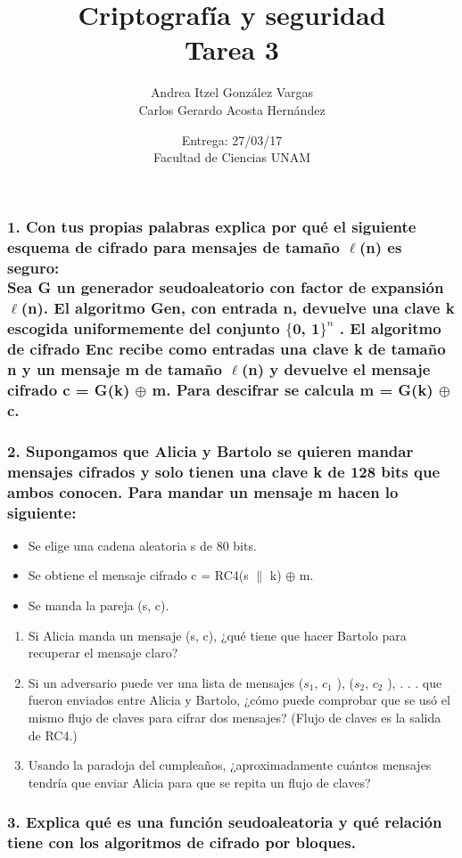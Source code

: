 \documentclass[12pt]{article}
\title{Criptografía y seguridad \\ Tarea 3}
\author{Andrea Itzel González Vargas \\ Carlos Gerardo Acosta Hernández}
\date{Entrega: 27/03/17 \\ Facultad de Ciencias UNAM}
\begin{document}
\maketitle
\subsubsection*{1. Con tus propias palabras explica por qué el siguiente esquema de cifrado para mensajes de tamaño $\ell$(n) es seguro: \\
Sea G un generador seudoaleatorio con factor de expansión $\ell$(n). El algoritmo Gen, con entrada n, devuelve una clave k escogida uniformemente del conjunto $\{$0, 1$\}^n$ . El algoritmo de cifrado Enc recibe como entradas una clave k de tamaño n y un mensaje m de tamaño $\ell$(n) y devuelve el mensaje cifrado c = G(k) $\oplus$ m. Para descifrar se calcula m = G(k) $\oplus$ c.}

\subsubsection*{2. Supongamos que Alicia y Bartolo se quieren mandar mensajes cifrados y solo tienen una clave k de 128 bits que ambos conocen. Para mandar un mensaje m hacen lo siguiente:}
\begin{itemize}
\item Se elige una cadena aleatoria s de 80 bits.
\item Se obtiene el mensaje cifrado c = RC4(s $\parallel$ k) $\oplus$ m.
\item Se manda la pareja (s, c).
\end{itemize}
\begin{enumerate}[label=\alph*)]
\item Si Alicia manda un mensaje (s, c), ¿qué tiene que hacer Bartolo para recuperar el mensaje claro?
\item Si un adversario puede ver una lista de mensajes ($s_1$, $c_1$ ), ($s_2$, $c_2$ ), . . . que fueron enviados entre Alicia y Bartolo, ¿cómo puede comprobar que se usó el mismo flujo de claves para cifrar dos mensajes? (Flujo de claves es la salida de RC4.)
\item Usando la paradoja del cumpleaños, ¿aproximadamente cuántos mensajes tendría que enviar Alicia para que se repita un flujo de claves?
\end{enumerate}

\subsubsection*{3. Explica qué es una función seudoaleatoria y qué relación tiene con los algoritmos de cifrado por bloques.}
\end{document}
